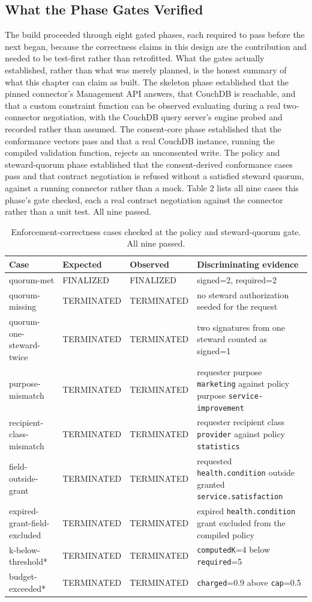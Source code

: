 \subsection{What the Phase Gates Verified}

The build proceeded through eight gated phases, each required to pass before the next began, because the correctness claims in this design are the contribution and needed to be test-first rather than retrofitted. What the gates actually established, rather than what was merely planned, is the honest summary of what this chapter can claim as built. The skeleton phase established that the pinned connector's Management API answers, that CouchDB is reachable, and that a custom constraint function can be observed evaluating during a real two-connector negotiation, with the CouchDB query server's engine probed and recorded rather than assumed. The consent-core phase established that the conformance vectors pass and that a real CouchDB instance, running the compiled validation function, rejects an unconsented write. The policy and steward-quorum phase established that the consent-derived conformance cases pass and that contract negotiation is refused without a satisfied steward quorum, against a running connector rather than a mock. Table 2 lists all nine cases this phase's gate checked, each a real contract negotiation against the connector rather than a unit test. All nine passed.

\begin{table}[H]
\caption{Enforcement-correctness cases checked at the policy and steward-quorum gate. All nine passed.\label{tab:t2}}
\begin{tabularx}{\textwidth}{lllX}
\toprule
Case & Expected & Observed & Discriminating evidence \\
\midrule
quorum-met & FINALIZED & FINALIZED & signed=2, required=2 \\
quorum-missing & TERMINATED & TERMINATED & no steward authorization seeded for the request \\
quorum-one-steward-twice & TERMINATED & TERMINATED & two signatures from one steward counted as signed=1 \\
purpose-mismatch & TERMINATED & TERMINATED & requester purpose \texttt{marketing} against policy purpose \texttt{service-improvement} \\
recipient-class-mismatch & TERMINATED & TERMINATED & requester recipient class \texttt{provider} against policy \texttt{statistics} \\
field-outside-grant & TERMINATED & TERMINATED & requested \texttt{health.condition} outside granted \texttt{service.satisfaction} \\
expired-grant-field-excluded & TERMINATED & TERMINATED & expired \texttt{health.condition} grant excluded from the compiled policy \\
k-below-threshold* & TERMINATED & TERMINATED & \texttt{computedK}=4 below \texttt{required}=5 \\
budget-exceeded* & TERMINATED & TERMINATED & \texttt{charged}=0.9 above \texttt{cap}=0.5 \\
\bottomrule
\end{tabularx}
\end{table}

